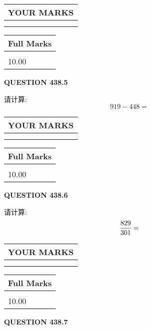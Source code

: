 \documentclass{ctexart}
\begin{document}
\vspace{0.2in}
  
\noindent\begin{tabular}{|l|}
\hline
 YOUR MARKS  \\
\hline
 \\ 
 \\ 
\hline
\end{tabular}
\hspace{0.05in} \begin{tabular}{|l|}
\hline
 Full Marks  \\
\hline
 \\ 
10.00 \\
\hline
\end{tabular}
{\textbf{\Large{QUESTION
438.5 
}}}
  
  
 
请计算:
\begin{equation}
919 -   %
448 = \nonumber
\end{equation}
 

 

 
  
\vspace{0.2in}
  
\noindent\begin{tabular}{|l|}
\hline
 YOUR MARKS  \\
\hline
 \\ 
 \\ 
\hline
\end{tabular}
\hspace{0.05in} \begin{tabular}{|l|}
\hline
 Full Marks  \\
\hline
 \\ 
10.00 \\
\hline
\end{tabular}
{\textbf{\Large{QUESTION
438.6 
}}}
  
  
 
请计算:
\begin{equation}
\frac { %
829 }  {  %
301} = \nonumber
\end{equation}
 

 

 
  
\vspace{0.2in}
  
\noindent\begin{tabular}{|l|}
\hline
 YOUR MARKS  \\
\hline
 \\ 
 \\ 
\hline
\end{tabular}
\hspace{0.05in} \begin{tabular}{|l|}
\hline
 Full Marks  \\
\hline
 \\ 
10.00 \\
\hline
\end{tabular}
{\textbf{\Large{QUESTION
438.7 
}}}
  
\end{document}

